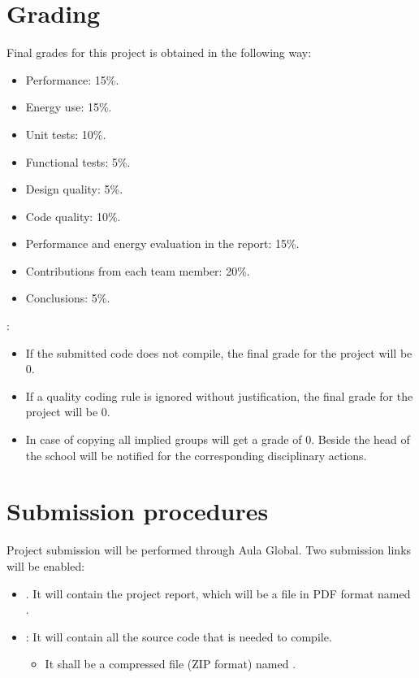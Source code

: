 \section{Grading}

Final grades for this project is obtained in the following way:

\begin{itemize}
  \item Performance: 15\%.
  \item Energy use: 15\%.
  \item Unit tests: 10\%.
  \item Functional tests: 5\%.
  \item Design quality: 5\%.
  \item Code quality: 10\%.
  \item Performance and energy evaluation in the report: 15\%.
  \item Contributions from each team member: 20\%.
  \item Conclusions: 5\%.  
\end{itemize}

:

\begin{itemize}
  \item If the submitted code does not compile, 
        the final grade for the project will be 0.

  \item If a quality coding rule is ignored without justification,
        the final grade for the project will be 0.
        
  \item In case of copying all implied groups will get a grade of 0.
        Beside the head of the school will be notified for
        the corresponding disciplinary actions.
\end{itemize}

\section{Submission procedures}

Project submission will be performed through Aula Global.
Two submission links will be enabled:

\begin{itemize}

\item {}. 
      It will contain the project report,
      which will be a file in PDF format named .

\item {}: 
      It will contain all the source code that is needed to compile.
\begin{itemize}
  \item It shall be a compressed file (ZIP format) named
        .
\end{itemize}

\end{itemize}

